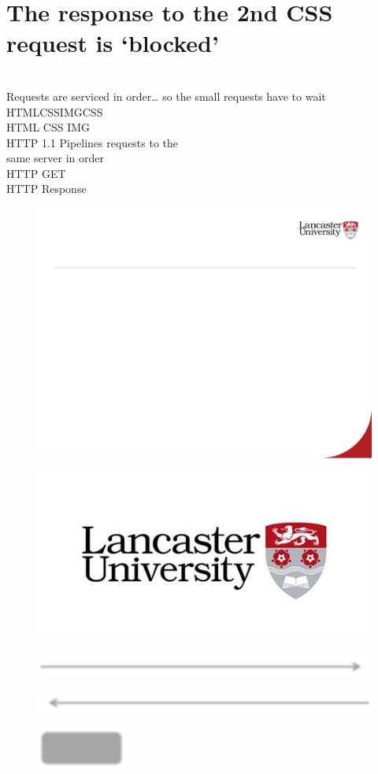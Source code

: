 \documentclass[12pt]{article}
\begin{document}
\section{The response to the 2nd CSS request is ‘blocked’}
\\
Requests are serviced in order… so the small requests have to wait\\
HTMLCSSIMGCSS\\
HTML CSS IMG\\
HTTP 1.1 Pipelines requests to the \\
same server in order\\
HTTP GET\\
HTTP Response\\
\begin{figure}[H]
\includegraphics[width=0.5\linewidth]{page78-image-1.png}
\end{figure}
\begin{figure}[H]
\includegraphics[width=0.5\linewidth]{page78-image-2.png}
\end{figure}
\begin{figure}[H]
\includegraphics[width=0.5\linewidth]{page78-image-3.png}
\end{figure}
\begin{figure}[H]
\includegraphics[width=0.5\linewidth]{page78-image-4.png}
\end{figure}
\begin{figure}[H]
\includegraphics[width=0.5\linewidth]{page78-image-5.png}
\end{figure}
\end{document}
